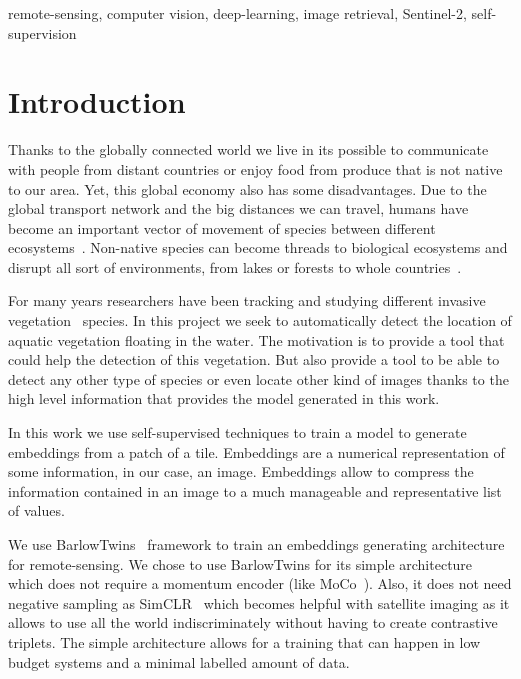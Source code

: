 \documentclass[conference]{IEEEtran}
\begin{document}
    \begin{IEEEkeywords}
        remote-sensing, computer vision, deep-learning, image retrieval, Sentinel-2, self-supervision
    \end{IEEEkeywords}


    \section{Introduction}
    Thanks to the globally connected world we live in its possible to communicate with people from distant countries or
    enjoy food from produce that is not native to our area.
    Yet, this global economy also has some disadvantages.
    Due to the global transport network and the big distances we can travel, humans have become an important vector of movement of species
    between different ecosystems~\cite{invasive_species}.
    Non-native species can become threads to biological ecosystems and disrupt all sort of environments,
    from lakes or forests to whole countries~\cite{bhlitem21490}.

    For many years researchers have been tracking and studying different invasive vegetation~\cite{huang2009applications, aguir2013, donyana1, donyana2} species.
    In this project we seek to automatically detect the location of aquatic vegetation floating in the water.
    The motivation is to provide a tool that could help the detection of this vegetation.
    But also provide a tool to be able to detect any other type of species or even locate other kind of images thanks to the
    high level information that provides the model generated in this work.

    In this work we use self-supervised techniques to train a model to generate embeddings from a patch of a tile.
    Embeddings are a numerical representation of some information, in our case, an image.
    Embeddings allow to compress the information contained in an image to a much manageable and representative list of values.

    We use BarlowTwins~\cite{barlowtwins} framework to train an embeddings generating architecture for remote-sensing.
    We chose to use BarlowTwins for its simple architecture which does not require a momentum encoder (like MoCo~\cite{he2020momentum, grill2020bootstrap}).
    Also, it does not need negative sampling as SimCLR~\cite{chen2020simple} which becomes helpful with satellite imaging as it allows to use
    all the world indiscriminately without having to create contrastive triplets.
    The simple architecture allows for a training that can happen in low budget systems and a minimal labelled amount of data.
\end{document}
